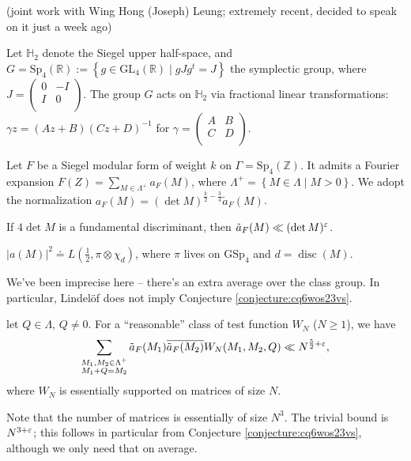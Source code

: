 \documentclass[reqno]{amsart} 
\begin{document}
(joint work with Wing Hong (Joseph) Leung; extremely recent, decided to speak on it just a week ago)

Let $\mathbb{H}_2$ denote the Siegel upper half-space, and $G = \mathrm{Sp}_4(\mathbb{R}) := \left\{ g \in \mathrm{GL}_4(\mathbb{R}) \mid g J g^t = J \right\}$ the symplectic group, where $J = \left(
  \begin{smallmatrix}
    0&-I\\
    I&0 \\
  \end{smallmatrix}
\right)$.  The group $G$ acts on $\mathbb{H}_2$ via fractional linear transformations: $\gamma z =(A z + B)(C z + D)^{-1}$ for $\gamma = \left(
  \begin{smallmatrix}
    A&B\\
    C&D \\
  \end{smallmatrix}
\right)$.

Let $F$ be a Siegel modular form of weight $k$ on $\Gamma = \mathrm{Sp}_4(\mathbb{Z})$.  It admits a Fourier expansion $F(Z) = \sum_{M \in \Lambda^+} a_F(M)$, where $\Lambda^+ = \left\{ M \in \Lambda \mid M > 0 \right\}$.  We adopt the normalization $a_F(M) =(\det M)^{\frac{k}{2} - \frac{3}{4}} \tilde{a}_F(M)$.

\begin{conjecture}\label{conjecture:cq6wos23vs}
  If $4 \det M$ is a fundamental discriminant, then $\tilde{a}_F(M) \ll(\det M)^\varepsilon$.
\end{conjecture}

\begin{conjecture}[Borcherer]
  $\lvert a(M) \rvert^2 \doteq L(\tfrac{1}{2}, \pi \otimes \chi_d)$, where $\pi$ lives on $\mathrm{GSp}_4$ and $d = \operatorname{disc}(M)$.
\end{conjecture}

We've been imprecise here -- there's an extra average over the class group.  In particular, Lindelöf does not imply Conjecture \ref{conjecture:cq6wos23vs}.

\begin{theorem}[Leung, Y.\ 2025+]
  let $Q \in \Lambda$, $Q \neq 0$.  For a ``reasonable'' class of test function $W_N$ ($N \geq 1$), we have
  \begin{equation*}
    \sum_{
      \substack{
        M_1, M_2 \in \Lambda^+  \\
        M_1 + Q = M_2        
      }
    }
    \tilde{a}_F(M_1)
    \overline{\tilde{a}_F(M_2)}
    W_N(M_1, M_2, Q)
    \ll N^{\frac{5}{2} + \varepsilon},
  \end{equation*}
  where $W_N$ is essentially supported on matrices of size $N$.
\end{theorem}
Note that the number of matrices is essentially of size $N^3$.  The trivial bound is $N^{3 + \varepsilon}$; this follows in particular from Conjecture \ref{conjecture:cq6wos23vs}, although we only need that on average.
\end{document}
